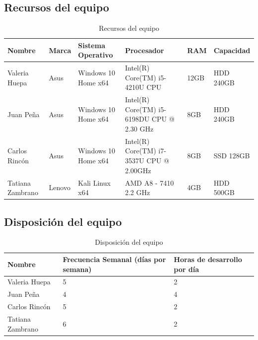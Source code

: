 \documentclass[a4paper,12 pt]{article}
\begin{document}
\subsection{Recursos del equipo}

\begin{table}[H]
    \centering
    \small{
    \begin{tabular}{|M{2cm}|M{1.5cm}|M{3cm}|M{3cm}|M{1.5cm}|M{2cm}|}
        \hline
        \textbf{Nombre}    &\textbf{Marca}     &\textbf{Sistema Operativo} 
        &\textbf{Procesador}   &\textbf{RAM}   &\textbf{Capacidad}\\
        \hline
        Valeria Huepa                       &Asus   &Windows 10 Home x64 
        & Intel(R) Core(TM) i5-4210U CPU    &12GB   &HDD 240GB \\
        \hline
        Juan Peña                           &Asus   &Windows 10 Home x64
        &Intel(R) Core(TM) i5-6198DU CPU @ 2.30 GHz &8GB    &HDD 240GB\\
        \hline
        Carlos Rincón                       &Asus   &Windows 10 Home x64
        &Intel(R) Core(TM) i7-3537U CPU @ 2.00GHz   &8GB    &SSD 128GB\\
        \hline
        Tatiana Zambrano                    &Lenovo &Kali Linux x64
        &AMD A8 - 7410 2.2 GHz              &4GB    &HDD 500GB\\
        \hline
    \end{tabular}
    \caption{Recursos del equipo}
    \label{T01}}
\end{table}{}

\subsection{Disposición del equipo}

\begin{table}[H]
    \centering
    \small{
    \begin{tabular}{|M{2cm}|M{4cm}|M{4cm}|}
        \hline
        \textbf{Nombre}    & \textbf{Frecuencia Semanal (días por semana)}   
        &\textbf{Horas de desarrollo por día}\\
        \hline
        Valeria Huepa   &   5    &   2   \\
        \hline
        Juan Peña       &   4    &    4   \\
        \hline
        Carlos Rincón   &   5    &  2     \\
        \hline
        Tatiana Zambrano    & 6      &  2     \\
        \hline
    \end{tabular}
    \caption{Disposición del equipo}
    \label{tab:my_label}}
\end{table}{}
\end{document}
